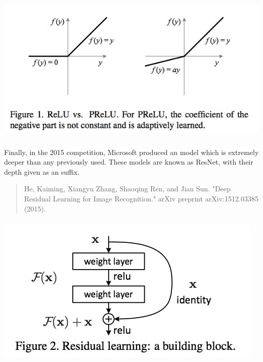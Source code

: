 \documentclass[xetex,mathserif,serif,aspectratio=169]{beamer}
\begin{document}
\begin{frame}[fragile] \frametitle{} \oldB \small

\begin{center}
\includegraphics[width=\textwidth]{img/prelunetActivation.jpg}
\end{center}

\end{frame}

\begin{frame}[fragile] \frametitle{} \oldB \small


Finally, in the 2015 competition, Microsoft produced an model
which is extremely deeper than any previously used. These models
are known as ResNet, with their depth given as an suffix.
\begin{quote}
He, Kaiming, Xiangyu Zhang, Shaoqing Ren, and Jian Sun.
"Deep Residual Learning for Image Recognition." arXiv preprint
arXiv:1512.03385 (2015).
\end{quote}

\end{frame}

\begin{frame}[fragile] \frametitle{} \oldB \small

\begin{center}
\includegraphics[width=\textwidth]{img/resNetresidualUnit.jpg}
\end{center}

\end{frame}
\end{document}
